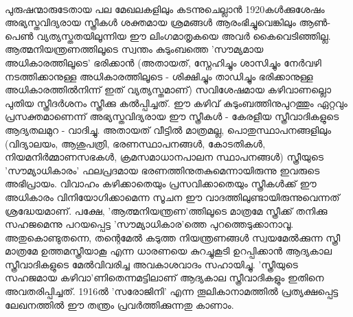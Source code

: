 \paragraph{}പുരുഷന്മാരുടേതായ പല മേഖലകളിലും കടന്നുചെല്ലാൻ 1920കൾക്കുശേഷം അഭ്യസ്തവിദ്യരായ സ്ത്രീകൾ ശക്തമായ ശ്രമങ്ങൾ ആരംഭിച്ചുവെങ്കിലും ആൺ-പെൺ വ്യത്യസ്തതയിലൂന്നിയ ഈ ലിംഗമാതൃകയെ അവർ കൈവെടിഞ്ഞില്ല. ആത്മനിയന്ത്രണത്തിലൂടെ സ്വന്തം കുടുംബത്തെ 'സൗമ്യമായ അധികാരത്തിലൂടെ' ഭരിക്കാൻ (അതായത്, സ്നേഹിച്ചും ശാസിച്ചും നേർവഴി നടത്തിക്കാനുള്ള അധികാരത്തിലൂടെ - ശിക്ഷിച്ചും താഡിച്ചും ഭരിക്കാനുള്ള അധികാരത്തിൽനിന്ന് ഇത് വ്യത്യസ്തമാണ്) സവിശേഷമായ കഴിവാണല്ലൊ പുതിയ സ്ത്രീദർശനം സ്ത്രീക്കു കൽപ്പിച്ചത്. ഈ കഴിവ് കുടുംബത്തിനുപുറത്തും ഏറ്റവും പ്രസക്തമാണെന്ന് അഭ്യസ്തവിദ്യരായ ഈ സ്ത്രീകൾ - കേരളീയ സ്ത്രീവാദികളുടെ ആദ്യതലമുറ - വാദിച്ചു. അതായത് വീട്ടിൽ മാത്രമല്ല, പൊതുസ്ഥാപനങ്ങളിലും (വിദ്യാലയം, ആശുപത്രി, ഭരണസ്ഥാപനങ്ങൾ, കോടതികൾ, നിയമനിർമ്മാണസഭകൾ, ക്രമസമാധാനപാലന സ്ഥാപനങ്ങൾ) സ്ത്രീയുടെ 'സൗമ്യാധികാരം' ഫലപ്രദമായ ഭരണത്തിനുതകുമെന്നായിരുന്നു ഇവരുടെ അഭിപ്രായം. വിവാഹം കഴിക്കാതെയും പ്രസവിക്കാതെയും സ്ത്രീകൾക്ക് ഈ അധികാരം വിനിയോഗിക്കാമെന്ന സൂചന ഈ വാദത്തിലുണ്ടായിരുന്നുവെന്നത് ശ്രദ്ധേയമാണ്. പക്ഷേ, 'ആത്മനിയന്ത്രണ'ത്തിലൂടെ മാത്രമേ സ്ത്രീക്ക് തനിക്കു സഹജമെന്നു പറയപ്പെട്ട 'സൗമ്യാധികാര'ത്തെ പുറത്തെടുക്കാനാവൂ. അതുകൊണ്ടുതന്നെ, തന്റെമേൽ കടുത്ത നിയന്ത്രണങ്ങൾ സ്വയമേൽക്കുന്ന സ്ത്രീ മാത്രമേ ഉത്തമസ്ത്രീയാകൂ എന്ന ധാരണയെ കുറച്ചുകൂടി ഉറപ്പിക്കാൻ ആദ്യകാല സ്ത്രീവാദികളുടെ മേൽവിവരിച്ച അവകാശവാദം സഹായിച്ചു. 'സ്ത്രീയുടെ സഹജമായ കഴിവാ'ണിതെന്നമട്ടിലാണ് ആദ്യകാല സ്ത്രീവാദികളും ഇതിനെ അവതരിപ്പിച്ചത്. 1916ൽ 'സരോജിനി' എന്ന തൂലികാനാമത്തിൽ പ്രത്യക്ഷപ്പെട്ട ലേഖനത്തിൽ ഈ തന്ത്രം പ്രവർത്തിക്കുന്നതു കാണാം.





